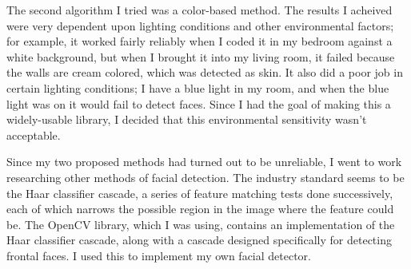 \documentclass[letterpaper]{article}
\begin{document}
The second algorithm I tried was a color-based method. The results I
acheived were very dependent upon lighting conditions and other
environmental factors; for example, it worked fairly reliably when I
coded it in my bedroom against a white background, but when I brought
it into my living room, it failed because the walls are cream colored,
which was detected as skin. It also did a poor job in certain lighting
conditions; I have a blue light in my room, and when the blue light
was on it would fail to detect faces. Since I had the goal of making
this a widely-usable library, I decided that this environmental
sensitivity wasn't acceptable.

Since my two proposed methods had turned out to be unreliable, I went
to work researching other methods of facial detection. The industry
standard seems to be the Haar classifier cascade, a series of feature
matching tests done successively, each of which narrows the possible
region in the image where the feature could be. The OpenCV library,
which I was using, contains an implementation of the Haar classifier
cascade, along with a cascade designed specifically for detecting
frontal faces. I used this to implement my own facial detector.
\end{document}
